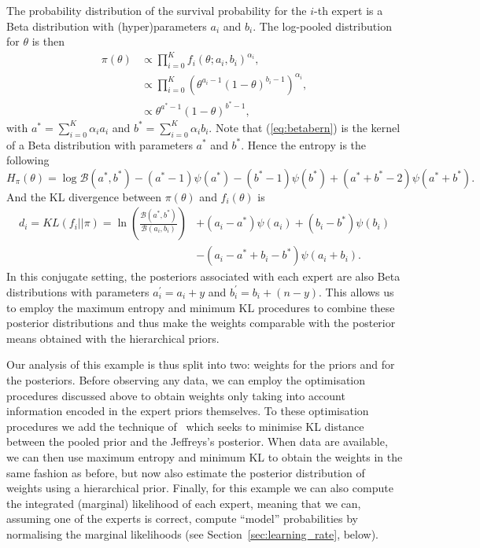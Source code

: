 \documentclass[a4paper, notitlepage, 11pt]{article}
\begin{document}
The probability distribution of the survival probability for the $i$-th expert is a Beta distribution with (hyper)parameters $a_i$ and $b_i$.
The log-pooled distribution for $\theta$ is then
\begin{align}
\nonumber
\pi(\theta) & \propto \prod_{i=0}^{K}f_i(\theta;a_i,b_i)^{\alpha_i},\\
\nonumber
            & \propto \prod_{i=0}^{K} \left(\theta^{a_i-1}(1-\theta)^{b_i-1} \right)^{\alpha_i},\\
\label{eq:betabern}
&\propto \theta^{a^*-1}(1-\theta)^{b^*-1},
\end{align}
with $a^* =\sum_{i=0}^{K}\alpha_ia_i$ and $b^* = \sum_{i=0}^{K}\alpha_ib_i$.
Note that (\ref{eq:betabern}) is the kernel of a Beta distribution with parameters $a^*$ and $b^*$. Hence the entropy is the following
\begin{equation}
 \label{eq:entropybeta}
 H_{\pi}(\theta) = \log \mathcal{B}(a^*,b^*) - (a^*-1)\psi(a^*) - (b^*-1)\psi(b^*) + (a^*+b^* -2)\psi(a^*+b^*).
\end{equation}
And the KL divergence between $\pi(\theta)$ and $f_i(\theta)$  is
\begin{equation}
\begin{split}
 \label{eq:KLbeta}
 d_i = KL(f_i || \pi) = \ln\left(\frac{\mathcal{B}(a^*, b^*)}{\mathcal{B}(a_i, 
b_i)}\right) & + (a_i - a^*) \psi(a_i)+ (b_i - b^*)\psi(b_i) \\
 &- (a_i-a^* + b_i - b^*)\psi(a_i + b_i).
\end{split}
\end{equation}
In this conjugate setting, the posteriors associated with each expert are also Beta distributions with
parameters $a_i^\prime = a_i + y$ and $b_i^\prime = b_i + (n-y)$.
This allows us to employ the maximum entropy and minimum KL procedures to combine these posterior distributions and thus make the weights comparable with the posterior means obtained with the hierarchical priors.

Our analysis of this example is thus split into two: weights for the priors and for the posteriors.
Before observing any data, we can employ the optimisation procedures discussed above to obtain weights only taking into account information encoded in the expert priors themselves.
To these optimisation procedures we add the technique of~\cite{Rufo2012B} which seeks to minimise KL distance between the pooled prior and the Jeffreys's posterior.
When data are available, we can then use maximum entropy and minimum KL to obtain the weights in the same fashion as before, but now  also estimate the posterior distribution of weights using a hierarchical prior.
Finally, for this example we can also compute the integrated (marginal) likelihood of each expert, meaning that we can, assuming one of the experts is correct, compute ``model'' probabilities by normalising the marginal likelihoods (see Section~\ref{sec:learning_rate}, below).
\end{document}
